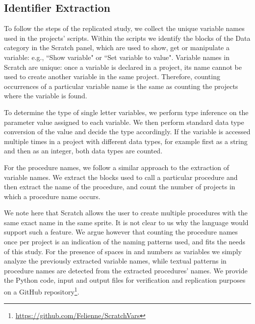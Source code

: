 \documentclass[conference]{IEEEtran}
\begin{document}
\subsection{Identifier Extraction}
To follow the steps of the replicated study, we collect the unique variable names used in the projects' scripts. 
Within the scripts we identify the blocks of the Data category in the Scratch panel, which are used to show, get or manipulate a variable: e.g., ``Show variable" or ``Set variable to value". 
Variable names in Scratch are unique: once a variable is declared in a project, its name cannot be used to create another variable in the same project. %
Therefore, counting occurrences of a particular variable name is the same as counting the projects where the variable is found. 

To determine the type of single letter variables, we perform type inference on the parameter value assigned to each variable. 
We then perform standard data type conversion of the value and decide the type accordingly.
If the variable is accessed multiple times in a project with different data types, for example first as a string and then as an integer, both data types are counted.

For the procedure names, we follow a similar approach to the extraction of variable names. We extract the blocks used to call a particular procedure and then extract the name of the procedure, and count the number of projects in which a procedure name occurs. 

We note here that Scratch allows the user to create multiple procedures with the same exact name in the same sprite. It is not clear to us why the language would support such a feature.  We argue however that counting the procedure names once per project is an indication of the naming patterns used, and fits the needs of this study. For the presence of spaces in and numbers as variables we simply analyze the previously extracted variable names, while textual patterns in procedure names are detected from the extracted procedures' names.
We provide the Python code, input and output files for verification and replication purposes on a GitHub repository\footnote{\url{https://github.com/Felienne/ScratchVars}}.
\end{document}
